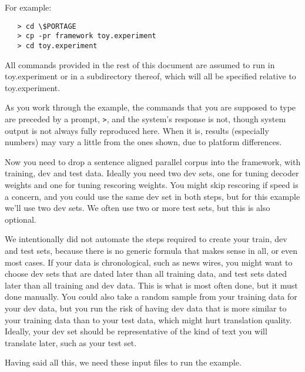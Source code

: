 \documentclass[11pt]{article}
\begin{document}
For example:
\begin{verbatim}
   > cd \$PORTAGE
   > cp -pr framework toy.experiment
   > cd toy.experiment
\end{verbatim}
All commands provided in the rest of this document are assumed to run in
toy.experiment or in a subdirectory thereof, which will all be specified
relative to toy.experiment.

As you work through the example, the commands that you are supposed to type are
preceded by a prompt, \texttt{>}, and the system's response is not, though
system output is not always fully reproduced here.  When it is, results
(especially numbers) may vary a little from the ones shown, due to platform
differences.

Now you need to drop a sentence aligned parallel corpus into the framework,
with training, dev and test data.  Ideally you need two dev sets, one for
tuning decoder weights and one for tuning rescoring weights.  You might skip
rescoring if speed is a concern, and you could use the same dev set in both
steps, but for this example we'll use two dev sets.  We often use two or more
test sets, but this is also optional.

We intentionally did not automate the steps required to create your train, dev
and test sets, because there is no generic formula that makes sense in all, or
even most cases.  If your data is chronological, such as news wires, you might
want to choose dev sets that are dated later than all training data, and test
sets dated later than all training and dev data.  This is what is most often
done, but it must done manually.  You could also take a random sample from your
training data for your dev data, but you run the risk of having dev data that
is more similar to your training data than to your test data, which might hurt
translation quality.  Ideally, your dev set should be representative of the
kind of text you will translate later, such as your test set.

Having said all this, we need these input files to run the example.  
\end{document}
